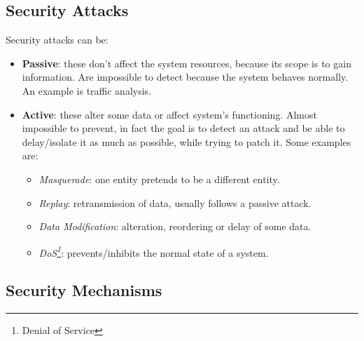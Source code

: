 \documentclass[oneside]{academica}
\begin{document}
\subsection{Security Attacks}
Security attacks can be:
\begin{itemize}
  \item \textbf{Passive}: these don't affect the system resources, because its scope is to gain information. Are impossible to detect because the system behaves normally. An example is traffic analysis.
  \item \textbf{Active}: these alter some data or affect system's functioning. Almost impossible to prevent, in fact the goal is to detect an attack and be able to delay/isolate it as much as possible, while trying to patch it. Some examples are:
    \begin{itemize}
      \item \textit{Masquerade}: one entity pretends to be a different entity.
      \item \textit{Replay}: retransmission of data, usually follows a passive attack.
      \item \textit{Data Modification}: alteration, reordering or delay of some data.
      \item \textit{DoS\footnote{Denial of Service}}: prevents/inhibits the normal state of a system.
    \end{itemize}
\end{itemize}

\subsection{Security Mechanisms}
\end{document}
